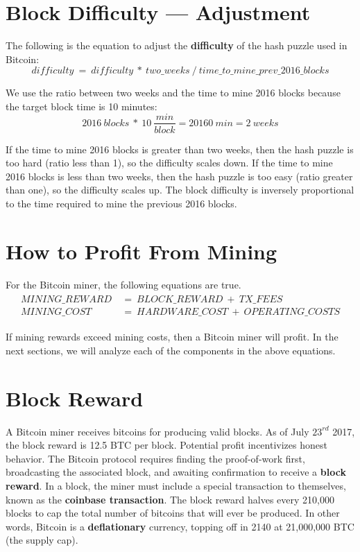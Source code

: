 \documentclass[full.tex]{subfiles}
\begin{document}
    \section*{Block Difficulty --- Adjustment}
    
    \noindent The following is the equation to adjust the \textbf{difficulty} of the hash puzzle used in Bitcoin:
    $$\mathit{difficulty}~=~\mathit{difficulty~*~two\_weeks~/~time\_to\_mine\_prev\_2016\_blocks}$$
    
    \noindent We use the ratio between two weeks and the time to mine 2016 blocks because the target block time is 10 minutes:
    $$\mathit{2016~blocks~*~10~\frac{min}{block}=20160~min=2~weeks}$$
    
    If the time to mine 2016 blocks is greater than two weeks, then the hash puzzle is too hard (ratio less than 1), so the difficulty scales down. If the time to mine 2016 blocks is less than two weeks, then the hash puzzle is too easy (ratio greater than one), so the difficulty scales up. The block difficulty is inversely proportional to the time required to mine the previous 2016 blocks.
    
    \section*{How to Profit From Mining}
    
    \noindent For the Bitcoin miner, the following equations are true.
    \begin{align*}
        \begin{split}
            \mathit{MINING\_REWARD}~&=~\mathit{BLOCK\_REWARD~+~TX\_FEES} \\
            \mathit{MINING\_COST}~&=~\mathit{HARDWARE\_COST~+~OPERATING\_COSTS}
        \end{split}
    \end{align*}
    
    \noindent If mining rewards exceed mining costs, then a Bitcoin miner will profit. In the next sections, we will analyze each of the components in the above equations.
    
    \section*{Block Reward}
    
    A Bitcoin miner receives bitcoins for producing valid blocks. As of July $23^{rd}$ 2017, the block reward is 12.5 BTC per block. Potential profit incentivizes honest behavior. The Bitcoin protocol requires finding the proof-of-work first, broadcasting the associated block, and awaiting confirmation to receive a \textbf{block reward}. In a block, the miner must include a special transaction to themselves, known as the \textbf{coinbase transaction}. The block reward halves every 210,000 blocks to cap the total number of bitcoins that will ever be produced. In other words, Bitcoin is a \textbf{deflationary} currency, topping off in 2140 at 21,000,000 BTC (the supply cap).
    
\end{document}

